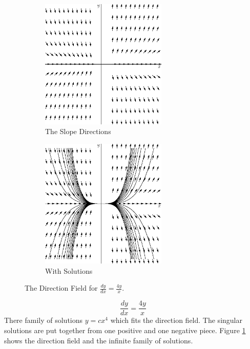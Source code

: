 \documentclass[fleqn,letterpaper]{report}
\begin{document}
\begin{figure}[t]
\centering
\begin{subfigure}{.5\textwidth}
\centering
\includegraphics[width=6cm]{figure10.eps}
\caption{The Slope Directions}
\end{subfigure}%
\begin{subfigure}{.5\textwidth}
\centering
\includegraphics[width=6cm]{figure11.eps}
\caption{With Solutions}
\end{subfigure}
\caption{The Direction Field for $\frac{dy}{dx} = \frac{4y}{x}$.}
\label{figure-direction-field3}
\end{figure}

\begin{example}
\begin{equation*}
\frac{dy}{dx} = \frac{4y}{x}
\end{equation*}
There family of solutions $y = cx^4$ which fits the direction
field. The singular solutions are put together from one positive and
one negative piece. Figure \ref{figure-direction-field3} shows
the direction field and the infinite family of solutions.  
\end{example}
\end{document}
